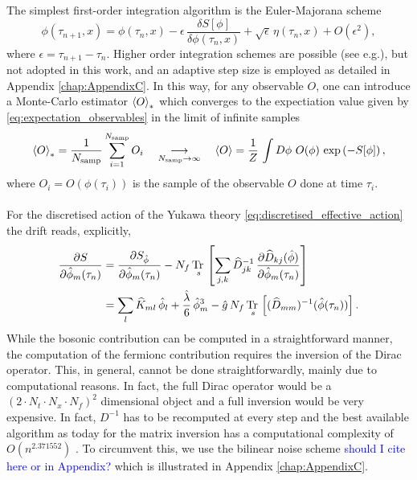 The simplest first-order integration algorithm is the Euler-Majorana scheme \cite{ParisiWu}
\begin{equation*}
    \phi(\tau_{n+1}, x) = \phi(\tau_{n}, x) - \epsilon \,  \frac{\delta S[\phi]}{\delta \phi (\tau_n, x)} + \sqrt{\epsilon} \, \eta(\tau_n, x) + O(\epsilon^2),
\end{equation*}
where $\epsilon = \tau_{n+1} - \tau_n$. Higher order integration schemes are possible (see e.g.\cite{bilinearnoise1,Kronfeld1993}), but not adopted in this work, and an adaptive step size is employed as detailed in Appendix \ref{chap:AppendixC}.
In this way, for any observable $O$, one can introduce a Monte-Carlo estimator $\left\langle O \right\rangle_*$ which converges to the expectiation value given by \eqref{eq:expectation_observables} in the limit of infinite samples
\begin{equation}
    \expect{O}_{*} = \frac{1}{N_\text{samp}} \sum^{N_\text{samp}}_{i=1} O_i \quad \underset{N_\text{samp} \to \infty}{\longrightarrow} \quad \expect{O} = \frac{1}{Z} \, \int D\phi \ O(\phi) \, \exp\left(-S[\phi]\right),
    \label{eq:monte_carlo_estimator}
\end{equation}
where $O_i = O(\phi(\tau_i))$ is the sample of the observable $O$ done at time $\tau_i$. \\~\\
For the discretised action of the Yukawa theory \eqref{eq:discretised_effective_action} the drift reads, explicitly,
\begin{equation}
    \begin{aligned}
        \frac{\partial S}{\partial \hat{\phi}_m(\tau_n)} &= \frac{\partial S_{\hat{\phi}}}{\partial \hat{\phi}_m(\tau_n)} - N_f \, \underset{s}{\operatorname{\text{Tr} \,}} \left[\sum_{j,k} \widehat{D}^{-1}_{jk}  \, \frac{\partial \widehat{D}_{kj}(\hat{\phi})}{\partial \hat{\phi}_m(\tau_n)}\right] \\
        &= \sum_l \widehat{K}_{ml} \, \hat\phi_l + \frac{\hat\lambda}{6} \, \hat\phi_m^3 - \hat g \, N_f \, \underset{s}{\operatorname{\text{Tr} \,}} \left[(\widehat{D}_{mm})^{-1}(\hat{\phi}(\tau_n))\right].
    \end{aligned}
    \label{eq:drift_continuum_full_theory}
\end{equation}
While the bosonic contribution can be computed in a straightforward manner, the computation of the fermionc contribution requires the inversion of the Dirac operator. This, in general, cannot be done straightforwardly, mainly due to computational reasons.
In fact, the full Dirac operator would be a $(2 \cdot N_t \cdot N_x \cdot N_f)^2$ dimensional object and a full inversion would be very expensive. In fact, $D^{-1}$ has to be recomputed at every step and the best available algorithm as today for the matrix inversion has a computational complexity of $O(n^{2.371552})$ \cite{williams2023new}. To circumvent this, we use the bilinear noise scheme \cite{bilinearnoise1,bilinearnoise2} \textcolor{blue}{should I cite here or in Appendix?} which is illustrated in Appendix \ref{chap:AppendixC}.



